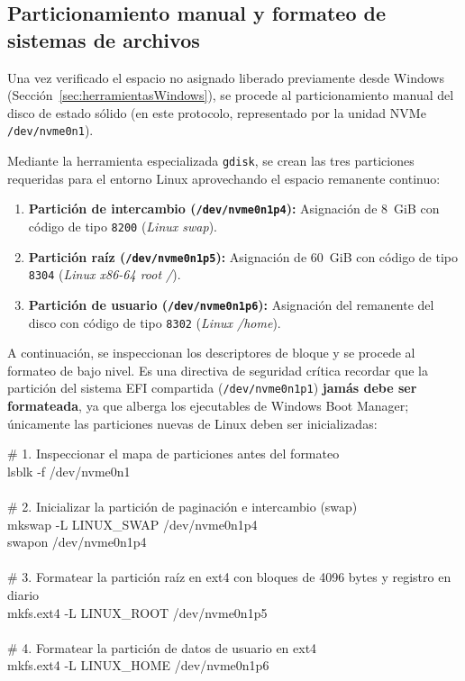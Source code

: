 \documentclass[12pt]{article}
\begin{document}
\subsection{Particionamiento manual y formateo de sistemas de archivos}
\label{sec:particionamientoManualFormateo}

Una vez verificado el espacio no asignado liberado previamente desde Windows (Sección~\ref{sec:herramientasWindows}), se procede al particionamiento manual del disco de estado sólido (en este protocolo, representado por la unidad NVMe \texttt{/dev/nvme0n1}).

Mediante la herramienta especializada \texttt{gdisk}, se crean las tres particiones requeridas para el entorno Linux aprovechando el espacio remanente continuo:
\begin{enumerate}[noitemsep, topsep=2pt]
    \item \textbf{Partición de intercambio (\texttt{/dev/nvme0n1p4}):} Asignación de 8~GiB con código de tipo \texttt{8200} (\textit{Linux swap}).
    \item \textbf{Partición raíz (\texttt{/dev/nvme0n1p5}):} Asignación de 60~GiB con código de tipo \texttt{8304} (\textit{Linux x86-64 root /}).
    \item \textbf{Partición de usuario (\texttt{/dev/nvme0n1p6}):} Asignación del remanente del disco con código de tipo \texttt{8302} (\textit{Linux /home}).
\end{enumerate}

A continuación, se inspeccionan los descriptores de bloque y se procede al formateo de bajo nivel. Es una directiva de seguridad crítica recordar que la partición del sistema EFI compartida (\texttt{/dev/nvme0n1p1}) \textbf{jamás debe ser formateada}, ya que alberga los ejecutables de Windows Boot Manager; únicamente las particiones nuevas de Linux deben ser inicializadas:

\begin{mdframed}[style=terminal]
\ttfamily\upshape\color{bashLetterColor}\footnotesize
\# 1. Inspeccionar el mapa de particiones antes del formateo \\
lsblk -f /dev/nvme0n1 \\
\\
\# 2. Inicializar la partición de paginación e intercambio (swap) \\
mkswap -L LINUX\_SWAP /dev/nvme0n1p4 \\
swapon /dev/nvme0n1p4 \\
\\
\# 3. Formatear la partición raíz en ext4 con bloques de 4096 bytes y registro en diario \\
mkfs.ext4 -L LINUX\_ROOT /dev/nvme0n1p5 \\
\\
\# 4. Formatear la partición de datos de usuario en ext4 \\
mkfs.ext4 -L LINUX\_HOME /dev/nvme0n1p6
\end{mdframed}
\end{document}
